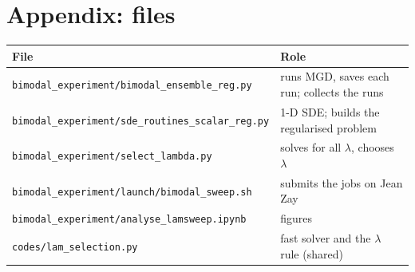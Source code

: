 \documentclass[11pt,a4paper]{article}
\newcommand{\code}[1]{\texttt{#1}}
\begin{document}
\section*{Appendix: files}
{\small\begin{tabular}{@{}ll@{}}
\toprule
File & Role \\
\midrule
\code{bimodal\_experiment/bimodal\_ensemble\_reg.py} & runs MGD, saves each run; collects the runs \\
\code{bimodal\_experiment/sde\_routines\_scalar\_reg.py} & 1-D SDE; builds the regularised problem \\
\code{bimodal\_experiment/select\_lambda.py} & solves for all $\lambda$, chooses $\lambda$ \\
\code{bimodal\_experiment/launch/bimodal\_sweep.sh} & submits the jobs on Jean Zay \\
\code{bimodal\_experiment/analyse\_lamsweep.ipynb} & figures \\
\code{codes/lam\_selection.py} & fast solver and the $\lambda$ rule (shared) \\
\bottomrule
\end{tabular}}
\end{document}
